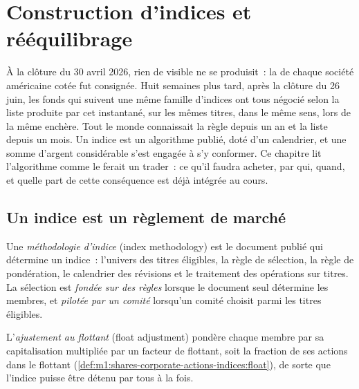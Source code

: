 \chapter{Construction d'indices et rééquilibrage}\label{ch:m1:index-construction-and-rebalancing}

À la clôture du 30 avril 2026, rien de visible ne se produisit~: la  de chaque société américaine cotée fut consignée. Huit semaines plus tard, après
la clôture du 26 juin, les fonds qui suivent une même famille d'indices ont tous
négocié selon la liste produite par cet instantané, sur les mêmes titres, dans le
même sens, lors de la même enchère. Tout le monde connaissait la règle depuis un an et
la liste depuis un mois. Un indice est un algorithme publié, doté d'un calendrier, et
une somme d'argent considérable s'est engagée à s'y conformer. Ce chapitre lit
l'algorithme comme le ferait un trader~: ce qu'il faudra acheter, par qui,
quand, et quelle part de cette conséquence est déjà intégrée au cours.

\section{Un indice est un règlement de marché}

\begin{definition}\label{def:m1:index-construction-and-rebalancing:methodology}
Une \emph{méthodologie d'indice} (index methodology) est le document publié
qui détermine un indice~: l'univers des titres éligibles, la
règle de sélection, la règle de pondération, le calendrier des révisions et le traitement
des opérations sur titres. La sélection est \emph{fondée sur des règles} lorsque le document
seul détermine les membres, et \emph{pilotée par un comité} lorsqu'un comité choisit
parmi les titres éligibles.
\end{definition}

\begin{definition}\label{def:m1:index-construction-and-rebalancing:floatadj}
L'\emph{ajustement au flottant} (float adjustment) pondère chaque membre par sa
capitalisation multipliée par un facteur de flottant, soit la fraction de ses
actions dans le flottant (\cref{def:m1:shares-corporate-actions-indices:float}), de sorte
que l'indice puisse être détenu par tous à la fois.
\end{definition}

